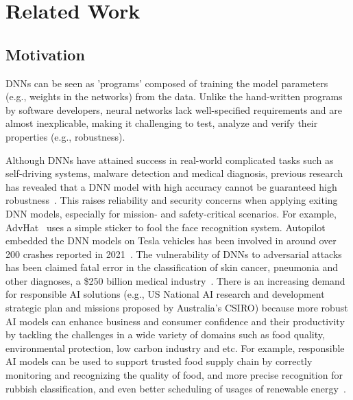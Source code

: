 \section{Related Work}\label{back}

\subsection{Motivation}

DNNs can be seen as 'programs' composed of training the model parameters (e.g., weights in the networks) from the data. Unlike the hand-written programs by software developers, neural networks lack well-specified requirements and are almost inexplicable, making it challenging to test, analyze and verify their properties (e.g., robustness).

Although DNNs have attained success in real-world complicated tasks such as self-driving systems, malware detection and medical diagnosis, previous research has revealed that a DNN model with high accuracy cannot be guaranteed high  robustness~\cite{ICSE2020W_B_Fairness_Test_Adversarial_Sampling,juuti2019prada,shi2020adaptive,tsipras2018robustness}. This raises reliability and security concerns when applying 
exiting DNN models, especially for mission- and safety-critical scenarios. For example, AdvHat~\cite{AdvHat} uses a simple sticker to fool the face recognition system. Autopilot embedded the DNN models on Tesla vehicles has been involved in around over 200 crashes reported in  2021~\cite{wang2019security}. The vulnerability of DNNs to adversarial attacks has been claimed fatal error in the classification of skin cancer, pneumonia and other diagnoses, a \$250 billion medical industry~\cite{finlayson2019adversarial}. 
There is an increasing demand for responsible AI solutions (e.g., US National AI research and development strategic plan and missions proposed by Australia's CSIRO) because more robust AI models can enhance business and consumer confidence and their productivity by tackling the challenges in a wide variety of domains such as food quality, environmental protection, low carbon industry and etc. For example, responsible AI models can be used to support trusted food supply chain by correctly monitoring and recognizing the quality of food, and more precise recognition for rubbish classification, and even better scheduling of usages of renewable energy~\cite{csiromission}.


